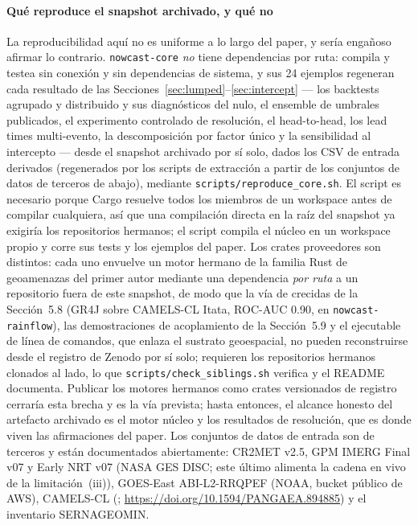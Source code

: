 \documentclass[authoryear,preprint,review,12pt]{elsarticle}
\begin{document}
\paragraph{Qué reproduce el snapshot archivado, y qué no}
La reproducibilidad aquí no es uniforme a lo largo del paper, y sería engañoso
afirmar lo contrario. \texttt{nowcast-core} \emph{no} tiene dependencias por ruta:
compila y testea sin conexión y sin dependencias de sistema, y sus 24 ejemplos
regeneran cada resultado de las Secciones~\ref{sec:lumped}--\ref{sec:intercept} ---
los backtests agrupado y distribuido y sus diagnósticos del nulo, el ensemble de
umbrales publicados, el experimento controlado de resolución, el head-to-head, los
lead times multi-evento, la descomposición por factor único y la sensibilidad al
intercepto --- desde el snapshot archivado por sí solo, dados los CSV de entrada
derivados (regenerados por los scripts de extracción a partir de los conjuntos de
datos de terceros de abajo), mediante \texttt{scripts/reproduce\_core.sh}. El script
es necesario porque Cargo resuelve todos los miembros de un workspace antes de
compilar cualquiera, así que una compilación directa en la raíz del snapshot ya
exigiría los repositorios hermanos; el script compila el núcleo en un workspace
propio y corre sus tests y los ejemplos del paper. Los crates proveedores son distintos: cada uno
envuelve un motor hermano de la familia Rust de geoamenazas del primer autor mediante una
dependencia \emph{por ruta} a un repositorio fuera de este snapshot, de modo que la
vía de crecidas de la Sección~5.8 (GR4J sobre CAMELS-CL Itata, ROC-AUC 0.90, en
\texttt{nowcast-rainflow}), las demostraciones de acoplamiento de la Sección~5.9 y
el ejecutable de línea de comandos, que enlaza el sustrato geoespacial, no pueden
reconstruirse desde el registro de Zenodo por sí solo; requieren los repositorios
hermanos clonados al lado, lo que \texttt{scripts/check\_siblings.sh} verifica y el
README documenta. Publicar los motores hermanos como crates versionados de registro
cerraría esta brecha y es la vía prevista; hasta entonces, el alcance honesto del
artefacto archivado es el motor núcleo y los resultados de resolución, que es donde
viven las afirmaciones del paper. Los conjuntos de datos de entrada son de terceros
y están documentados abiertamente: CR2MET v2.5, GPM IMERG Final v07 y Early NRT v07
(NASA GES DISC; este último alimenta la cadena en vivo de la limitación~(iii)),
GOES-East ABI-L2-RRQPEF (NOAA, bucket público de AWS), CAMELS-CL
(\citealp{alvarez2018}; \url{https://doi.org/10.1594/PANGAEA.894885}) y el
inventario SERNAGEOMIN.
\end{document}

